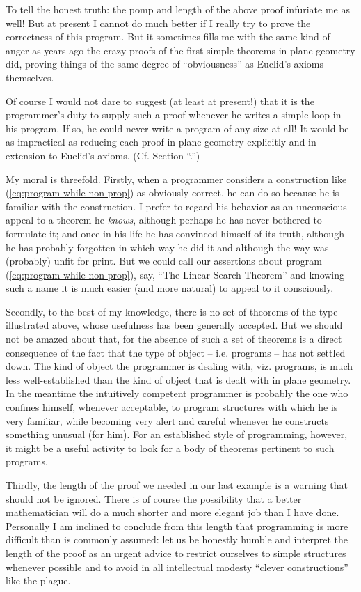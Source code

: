 To tell the honest truth: the pomp and length of the above proof infuriate me as well! But at present I cannot do much better if I really try to prove the correctness of this program. But it sometimes fills me with the same kind of anger as years ago the crazy proofs of the first simple theorems in plane geometry did, proving things of the same degree of ``obviousness'' as Euclid's axioms themselves.

Of course I would not dare to suggest (at least at present!) that it is the programmer's duty to supply such a proof whenever he writes a simple loop in his program. If so, he could never write a program of any size at all! It would be as impractical as reducing each proof in plane geometry explicitly and in extension to Euclid's axioms. (Cf. Section ``.'')

My moral is threefold. Firstly, when a programmer considers a construction like (\ref{eq:program-while-non-prop}) as obviously correct, he can do so because he is familiar with the construction. I prefer to regard his behavior as an unconscious appeal to a theorem he \textit{knows}, although perhaps he has never bothered to formulate it; and once in his life he has convinced himself of its truth, although he has probably forgotten in which way he did it and although the way was (probably) unfit for print. But we could call our assertions about program (\ref{eq:program-while-non-prop}), say, ``The Linear Search Theorem'' and knowing such a name it is much easier (and more natural) to appeal to it consciously.

Secondly, to the best of my knowledge, there is no set of theorems of the type illustrated above, whose usefulness has been generally accepted. But we should not be amazed about that, for the absence of such a set of theorems is a direct consequence of the fact that the type of object -- i.e. programs -- has not settled down. The kind of object the programmer is dealing with, viz. programs, is much less well-established than the kind of object that is dealt with in plane geometry. In the meantime the intuitively competent programmer is probably the one who confines himself, whenever acceptable, to program structures with which he is very familiar, while becoming very alert and careful whenever he constructs something unusual (for him). For an established style of programming, however, it might be a useful activity to look for a body of theorems pertinent to such programs.

Thirdly, the length of the proof we needed in our last example is a warning that should not be ignored. There is of course the possibility that a better mathematician will do a much shorter and more elegant job than I have done. Personally I am inclined to conclude from this length that programming is more difficult than is commonly assumed: let us be honestly humble and interpret the length of the proof as an urgent advice to restrict ourselves to simple structures whenever possible and to avoid in all intellectual modesty ``clever constructions'' like the plague.

